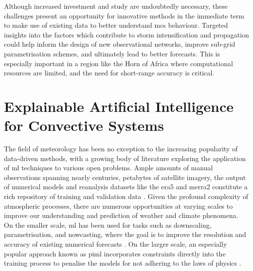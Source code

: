 Although increased investment and study are undoubtedly necessary, these challenges present an opportunity for innovative methods in the immediate term to make use of existing data to better understand \acrshort{mcs} behaviour. Targeted insights into the factors which contribute to storm intensification and propagation could help inform the design of new observational networks, improve sub-grid parametrisation schemes, and ultimately lead to better forecasts. This is especially important in a region like the Horn of Africa where computational resources are limited, and the need for short-range accuracy is critical.

\section{Explainable Artificial Intelligence for Convective Systems}

The field of meteorology has been no exception to the increasing popularity of data-driven methods, with a growing body of literature exploring the application of \acrshort{ml} techniques to various open problems. Ample amounts of manual observations spanning nearly centuries, petabytes of satellite imagery, the output of numerical models and reanalysis datasets like the \acrfull{era5} and \acrfull{merra2} constitute a rich repository of training and validation data \citep{Bracco2024,Waqas2024,Zhang2025}. Given the profound complexity of atmospheric processes, there are numerous opportunities at varying scales to improve our understanding and prediction of weather and climate phenomena. On the smaller scale, \acrshort{ml} has been used for tasks such as downscaling, parametrisation, and nowcasting, where the goal is to improve the resolution and accuracy of existing numerical forecasts \citep{Blunn2024,Zhang2023}. On the larger scale, an especially popular approach known as \acrfull{piml} incorporates constraints directly into the training process to penalise the models for not adhering to the laws of physics \citep{Pathak2022,Luo2025,Zhang2023}.

